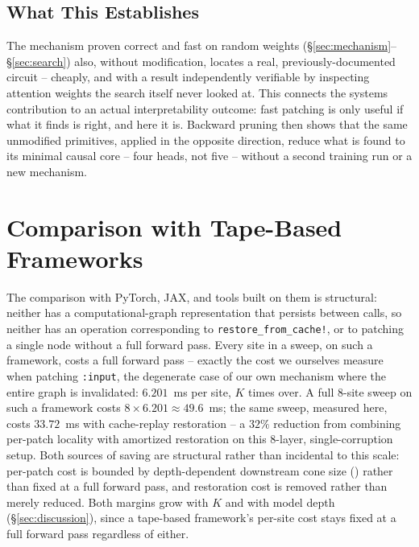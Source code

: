 \documentclass{article}
\begin{document}
\subsection{What This Establishes}

The mechanism proven correct and fast on random weights (\S\ref{sec:mechanism}--\S\ref{sec:search})
also, without modification, locates a real, previously-documented circuit -- cheaply, and with a
result independently verifiable by inspecting attention weights the search itself never looked
at. This connects the systems contribution to an actual interpretability outcome: fast patching is
only useful if what it finds is right, and here it is. Backward pruning then shows that the same
unmodified primitives, applied in the opposite direction, reduce what is found to its minimal
causal core -- four heads, not five -- without a second training run or a new mechanism.

\section{Comparison with Tape-Based Frameworks}
\label{sec:comparison}

The comparison with PyTorch, JAX, and tools built on them is structural: neither has a
computational-graph representation that persists between calls, so neither has an operation
corresponding to \texttt{restore\_from\_cache!}, or to patching a single node without a full
forward pass. Every site in a sweep, on such a framework, costs a full forward pass -- exactly
the cost we ourselves measure when patching \texttt{:input}, the degenerate case of our own
mechanism where the entire graph is invalidated: $6.201$~ms per site, $K$ times over. A full
8-site sweep on such a framework costs $8 \times 6.201 \approx 49.6$~ms; the same sweep, measured
here, costs $33.72$~ms with cache-replay restoration -- a $32\%$ reduction from combining
per-patch locality with amortized restoration on this 8-layer, single-corruption setup. Both
sources of saving are structural rather than incidental to this scale: per-patch cost is bounded
by depth-dependent downstream cone size () rather than fixed at a full forward
pass, and restoration cost is removed rather than merely reduced. Both margins grow with $K$ and
with model depth (\S\ref{sec:discussion}), since a tape-based framework's per-site cost stays
fixed at a full forward pass regardless of either.
\end{document}
